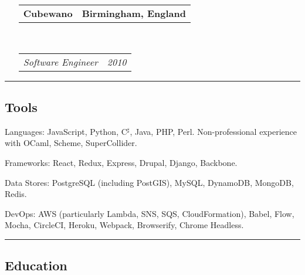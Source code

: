 \documentclass[10pt,letterpaper]{article}
\makeatletter
\newenvironment{indentsection}[1]%
{\begin{list}{}%
	{\setlength{\leftmargin}{#1}}%
	\item[]%
}
{\end{list}}
\newcommand{\headerrow}[2]
{\begin{tabular*}{\linewidth}{l@{\extracolsep{\fill}}r}
	#1 &
	#2 \\
\end{tabular*}}
\makeatother
\begin{document}
\begin{itemize}
	\item[]
	      \headerrow
	      {\textbf{Cubewano}}
	      {\textbf{Birmingham, England}}
	      \\
	      \headerrow
	      {\emph{Software Engineer}}
	      {\emph{2010}}

\end{itemize}

\begin{center}
	\hrule
	\subsection*{Tools}
\end{center}

\begin{indentsection}{\parindent}
	\begin{description*}
		\item[Languages:]
		JavaScript, Python, C$^\sharp$, Java, PHP, Perl. Non-professional experience with OCaml, Scheme, SuperCollider.
		\item[Frameworks:] React, Redux, Express, Drupal, Django, Backbone.
		\item[Data Stores:] PostgreSQL (including PostGIS), MySQL, DynamoDB, MongoDB, Redis.
		\item[DevOps:] AWS (particularly Lambda, SNS, SQS, CloudFormation), Babel, Flow, Mocha, CircleCI, Heroku, Webpack, Browserify, Chrome Headless.
	\end{description*}
\end{indentsection}

\begin{center}
	\hrule
	\vspace{-0.4em}
	\subsection*{Education}
\end{center}
\end{document}
